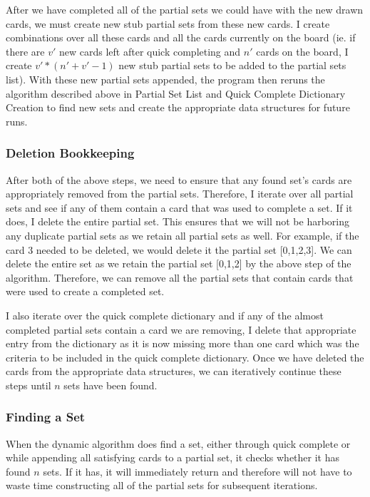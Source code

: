 \documentclass[pageno]{jpaper}
\begin{document}
After we have completed all of the partial sets we could have with the new drawn cards, we must create new stub partial sets from these new cards. I create combinations over all these cards and all the cards currently on the board (ie. if there are $v'$ new cards left after quick completing and $n'$ cards on the board, I create $v'*(n'+v'-1)$ new stub partial sets to be added to the partial sets list). With these new partial sets appended, the program then reruns the algorithm described above in Partial Set List and Quick Complete Dictionary Creation to find new sets and create the appropriate data structures for future runs. 

\subsubsection{Deletion Bookkeeping}

After both of the above steps, we need to ensure that any found set's cards are appropriately removed from the partial sets. Therefore, I iterate over all partial sets and see if any of them contain a card that was used to complete a set. If it does, I delete the entire partial set. This ensures that we will not be harboring any duplicate partial sets as we retain all partial sets as well. For example, if the card 3 needed to be deleted, we would delete it the partial set [0,1,2,3]. We can delete the entire set as we retain the partial set [0,1,2] by the above step of the algorithm. Therefore, we can remove all the partial sets that contain cards that were used to create a completed set.

I also iterate over the quick complete dictionary and if any of the almost completed partial sets contain a card we are removing, I delete that appropriate entry from the dictionary as it is now missing more than one card which was the criteria to be included in the quick complete dictionary. Once we have deleted the cards from the appropriate data structures, we can iteratively continue these steps until $n$ sets have been found. 

\subsubsection{Finding a Set}

When the dynamic algorithm does find a set, either through quick complete or while appending all satisfying cards to a partial set, it checks whether it has found $n$ sets. If it has, it will immediately return and therefore will not have to waste time constructing all of the partial sets for subsequent iterations.
\end{document}
